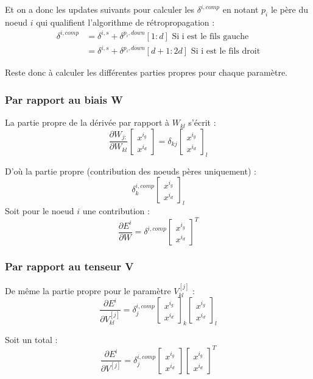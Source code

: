 \documentclass[conference]{IEEEtran}
\begin{document}
Et on a donc les updates suivants pour calculer les $\delta^{i,comp}$ en notant $p_i$ le père du noeud $i$ qui qualifient l'algorithme de rétropropagation :
\begin{align*}
\delta^{i,comp}&=\delta^{i,s}+\delta^{p_i,down}[1:d] \mbox{ Si i est le fils gauche}\\
&=\delta^{i,s}+\delta^{p_i,down}[d+1:2d] \mbox{ Si i est le fils droit}
\end{align*}

Reste donc à calculer les différentes parties propres pour chaque paramètre.

\subsubsection{Par rapport au biais W}
La partie propre de la dérivée par rapport à $W_{kl}$ s'écrit :
$$\frac{\partial W_{j:}}{\partial W_{kl}}\begin{bmatrix} x^{i_g} \\ x^{i_d} \end{bmatrix}=\delta_{kj}\begin{bmatrix} x^{i_g} \\ x^{i_d} \end{bmatrix}_l$$

D'où la partie propre (contribution des noeuds pères uniquement) : 
$$\delta^{i,comp}_k \begin{bmatrix} x^{i_g} \\ x^{i_d} \end{bmatrix}_l$$
Soit pour le noeud $i$ une contribution :
$$\frac{\partial E^i}{\partial W}=\delta^{i,comp} \begin{bmatrix} x^{i_g} \\ x^{i_d} \end{bmatrix}^T$$

\subsubsection{Par rapport au tenseur V}
De même la partie propre pour le paramètre $V^{[j]}_{kl}$ :
$$\frac{\partial E^i}{\partial V^{[j]}_{kl}} = \delta_j^{i,comp}\begin{bmatrix} x^{i_g} \\ x^{i_d} \end{bmatrix}_k\begin{bmatrix} x^{i_g} \\ x^{i_d} \end{bmatrix}_l$$

Soit un total :
$$\frac{\partial E^i}{\partial V^{[j]}} = \delta_j^{i,comp}\begin{bmatrix} x^{i_g} \\ x^{i_d} \end{bmatrix}\begin{bmatrix} x^{i_g} \\ x^{i_d} \end{bmatrix}^T$$
\end{document}
